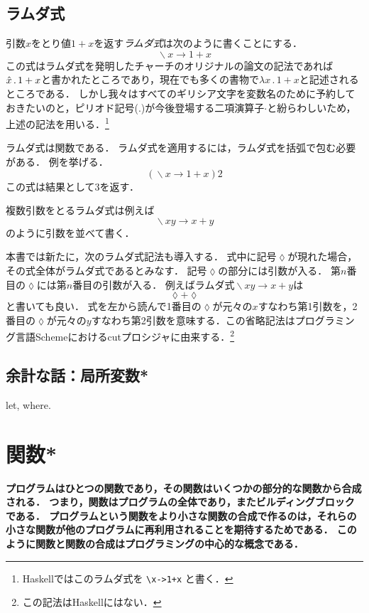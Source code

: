 \documentclass[twocolumn]{jsbook}
\newcommand{\keyword}[1]{\emph{#1}}
\newcommand{\code}[1]{\texttt{#1}}
\newenvironment{leader}{\begingroup\bf}{\endgroup}
\DeclareMathOperator{\mathLambda}{\backslash}
\newcommand{\mathLambdaAnonymousParameter}{\lozenge}
\newcommand{\mathLambdaArrow}{\rightarrow}
\newcommand{\mathLambdaExpression}[2]{\mathLambda#1\mathLambdaArrow#2}
\begin{document}
\section{ラムダ式}
引数$x$をとり値$1+x$を返す\keyword{ラムダ式}は次のように書くことにする．
$$\mathLambdaExpression{x}{1+x}$$
この式はラムダ式を発明したチャーチのオリジナルの論文の記法であれば$\Hat x\,.\,1+x$と書かれたところであり，現在でも多くの書物で$\lambda x\,.\,1+x$と記述されるところである．
しかし我々はすべてのギリシア文字を変数名のために予約しておきたいのと，ピリオド記号($.$)が今後登場する二項演算子$\cdot$と紛らわしいため，上述の記法を用いる．\footnote{Haskellではこのラムダ式を \code{\textbackslash x->1+x} と書く．}

ラムダ式は関数である．
ラムダ式を適用するには，ラムダ式を括弧で包む必要がある．
例を挙げる．
$$\left(\mathLambdaExpression{x}{1+x}\right)2$$
この式は結果として$3$を返す．

複数引数をとるラムダ式は例えば$$\mathLambdaExpression{xy}{x+y}$$のように引数を並べて書く．

本書では新たに，次のラムダ式記法も導入する．
式中に記号$\mathLambdaAnonymousParameter$が現れた場合，その式全体がラムダ式であるとみなす．
記号$\mathLambdaAnonymousParameter$の部分には引数が入る．
第$n$番目の$\mathLambdaAnonymousParameter$には第$n$番目の引数が入る．
例えばラムダ式$\mathLambdaExpression{xy}{x+y}$は$$\mathLambdaAnonymousParameter+\mathLambdaAnonymousParameter$$と書いても良い．
式を左から読んで1番目の$\mathLambdaAnonymousParameter$が元々の$x$すなわち第1引数を，2番目の$\mathLambdaAnonymousParameter$が元々の$y$すなわち第2引数を意味する．この省略記法はプログラミング言語Schemeにおけるcutプロシジャに由来する．\footnote{この記法はHaskellにはない．}

\section*{余計な話：局所変数*}

let, where.

\chapter{関数*}

\begin{leader}
プログラムはひとつの関数であり，その関数はいくつかの部分的な関数から合成される．
つまり，関数はプログラムの全体であり，またビルディングブロックである．
プログラムという関数をより小さな関数の合成で作るのは，それらの小さな関数が他のプログラムに再利用されることを期待するためである．
このように関数と関数の合成はプログラミングの中心的な概念である．
\end{leader}
\end{document}
